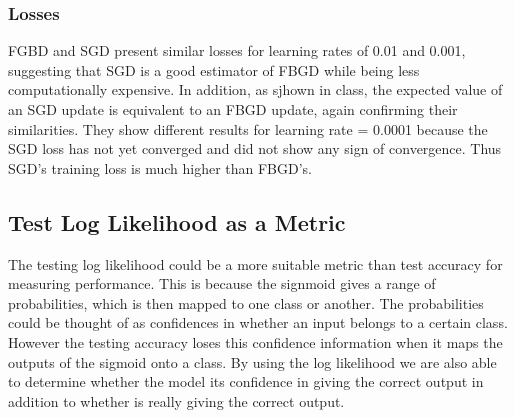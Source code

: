 \documentclass[11pt,letterpaper,titlepage]{article}
\begin{document}
	\subsubsection{Losses}
	FGBD and SGD present similar losses for learning rates of 0.01 and 0.001, suggesting that SGD is a good estimator of FBGD while being less computationally expensive. In addition, as sjhown in class, the expected value of an SGD update is equivalent to an FBGD update, again confirming their similarities. They show different results for learning rate = 0.0001 because the SGD loss has not yet converged and did not show any sign of convergence. Thus SGD's training loss is much higher than FBGD's.
	\subsection{Test Log Likelihood as a Metric}
	The testing log likelihood could be a more suitable metric than test accuracy for measuring performance. This is because the signmoid gives a range of probabilities, which is then mapped to one class or another. The probabilities could be thought of as confidences in whether an input belongs to a certain class. However the testing accuracy loses this confidence information when it maps the outputs of the sigmoid onto a class. By using the log likelihood we are also able to determine whether the model its confidence in giving the correct output in addition to whether is really giving the correct output.
	 
\end{document}
